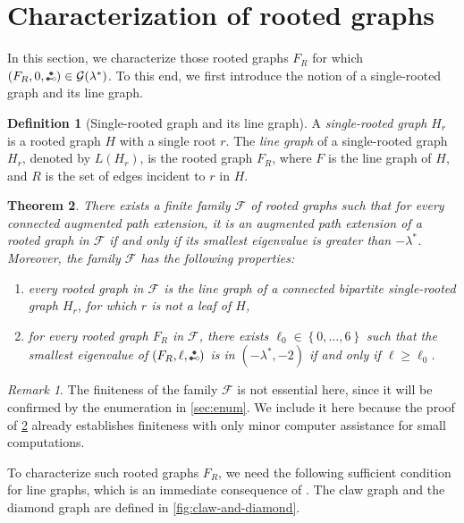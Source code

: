 \documentclass[11pt]{article}
\newtheorem{theorem}{Theorem}[section]
\theoremstyle{definition}
\newtheorem{definition}[theorem]{Definition}
\theoremstyle{remark}
\newtheorem*{remark}{Remark}
\newcommand{\sset}[1]{\left\{{#1}\right\}}
\newcommand{\las}{\lambda^*}
\newcommand{\F}{\mathcal{F}}
\newcommand{\G}{\mathcal{G}}
\newcommand{\etwo}{\tikz[baseline=-0.2ex, scale=0.9]{\draw[darkgray, thick] (0,0)--(0.2,0); \draw[darkgray, fill=darkgray] (0,0) circle (0.05); \draw[darkgray, fill=darkgray] (0.1,0.17320508075) circle (0.05); \draw[darkgray, fill=white] (0.2,0) circle (0.05);}}
\newcommand{\ape}[1]{(#1,\etwo)}
\begin{document}
\section{Characterization of rooted graphs} \label{sec:char}

In this section, we characterize those rooted graphs $F_R$ for which $\ape{F_R, 0} \in \G(\las)$. To this end, we first introduce the notion of a single-rooted graph and its line graph.

\begin{definition}[Single-rooted graph and its line graph]
    A \emph{single-rooted graph} $H_r$ is a rooted graph $H$ with a single root $r$. The \emph{line graph} of a single-rooted graph $H_r$, denoted by $L(H_r)$, is the rooted graph $F_R$, where $F$ is the line graph of $H$, and $R$ is the set of edges incident to $r$ in $H$.
\end{definition}

\begin{theorem} \label{thm:main2}
    There exists a finite family $\F$ of rooted graphs such that for every connected augmented path extension, it is an augmented path extension of a rooted graph in $\F$ if and only if its smallest eigenvalue is greater than $-\las$. Moreover, the family $\F$ has the following properties:
    \begin{enumerate}[label=(\alph*)]
        \item every rooted graph in $\F$ is the line graph of a connected bipartite single-rooted graph $H_r$, for which $r$ is not a leaf of $H$, \label{item:main2-a}
        \item for every rooted graph $F_R$ in $\F$, there exists $\ell_0 \in \sset{0,\dots,6}$ such that the smallest eigenvalue of $\ape{F_R, \ell}$ is in $(-\las,-2)$ if and only if $\ell \ge \ell_0$. \label{item:main2-c}
    \end{enumerate}
\end{theorem}

\begin{remark}
    The finiteness of the family $\F$ is not essential here, since it will be confirmed by the enumeration in \cref{sec:enum}. We include it here because the proof of \cref{thm:main2} already establishes finiteness with only minor computer assistance for small computations.
\end{remark}

To characterize such rooted graphs $F_R$, we need the following sufficient condition for line graphs, which is an immediate consequence of \cite[Theorem~4]{RW65}. The claw graph and the diamond graph are defined in \cref{fig:claw-and-diamond}.
\end{document}
